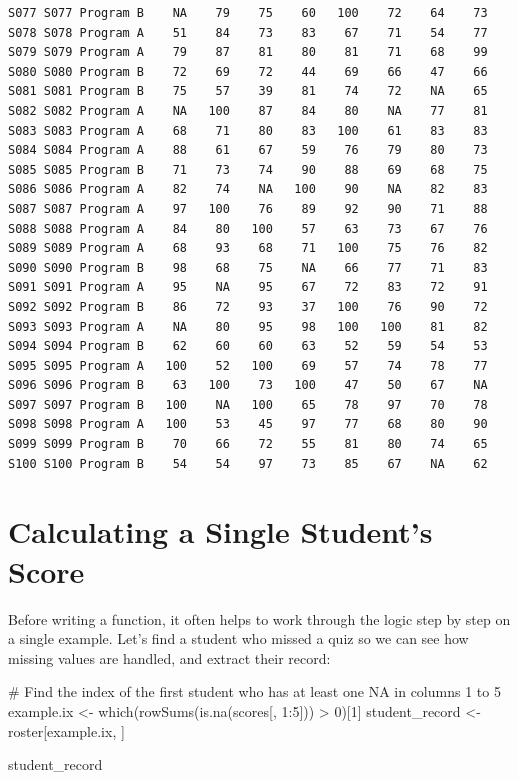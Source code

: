 \documentclass[
  letterpaper,
  DIV=11,
  numbers=noendperiod]{scrreprt}
\newenvironment{Shaded}{\begin{snugshade}}{\end{snugshade}}
\newcommand{\CommentTok}[1]{\textcolor[rgb]{0.37,0.37,0.37}{#1}}
\newcommand{\DecValTok}[1]{\textcolor[rgb]{0.68,0.00,0.00}{#1}}
\newcommand{\FunctionTok}[1]{\textcolor[rgb]{0.28,0.35,0.67}{#1}}
\newcommand{\NormalTok}[1]{\textcolor[rgb]{0.00,0.23,0.31}{#1}}
\newcommand{\OtherTok}[1]{\textcolor[rgb]{0.00,0.23,0.31}{#1}}
\newcommand{\SpecialCharTok}[1]{\textcolor[rgb]{0.37,0.37,0.37}{#1}}
\begin{document}
\begin{verbatim}
S077 S077 Program B    NA    79    75    60   100    72    64    73
S078 S078 Program A    51    84    73    83    67    71    54    77
S079 S079 Program A    79    87    81    80    81    71    68    99
S080 S080 Program B    72    69    72    44    69    66    47    66
S081 S081 Program B    75    57    39    81    74    72    NA    65
S082 S082 Program A    NA   100    87    84    80    NA    77    81
S083 S083 Program A    68    71    80    83   100    61    83    83
S084 S084 Program A    88    61    67    59    76    79    80    73
S085 S085 Program B    71    73    74    90    88    69    68    75
S086 S086 Program A    82    74    NA   100    90    NA    82    83
S087 S087 Program A    97   100    76    89    92    90    71    88
S088 S088 Program A    84    80   100    57    63    73    67    76
S089 S089 Program A    68    93    68    71   100    75    76    82
S090 S090 Program B    98    68    75    NA    66    77    71    83
S091 S091 Program A    95    NA    95    67    72    83    72    91
S092 S092 Program B    86    72    93    37   100    76    90    72
S093 S093 Program A    NA    80    95    98   100   100    81    82
S094 S094 Program B    62    60    60    63    52    59    54    53
S095 S095 Program A   100    52   100    69    57    74    78    77
S096 S096 Program B    63   100    73   100    47    50    67    NA
S097 S097 Program B   100    NA   100    65    78    97    70    78
S098 S098 Program A   100    53    45    97    77    68    80    90
S099 S099 Program B    70    66    72    55    81    80    74    65
S100 S100 Program B    54    54    97    73    85    67    NA    62
\end{verbatim}

\section{Calculating a Single Student's
Score}\label{calculating-a-single-students-score}

Before writing a function, it often helps to work through the logic step
by step on a single example. Let's find a student who missed a quiz so
we can see how missing values are handled, and extract their record:

\begin{Shaded}
\begin{Highlighting}[]
\CommentTok{\# Find the index of the first student who has at least one NA in columns 1 to 5}
\NormalTok{example.ix }\OtherTok{\textless{}{-}} \FunctionTok{which}\NormalTok{(}\FunctionTok{rowSums}\NormalTok{(}\FunctionTok{is.na}\NormalTok{(scores[, }\DecValTok{1}\SpecialCharTok{:}\DecValTok{5}\NormalTok{])) }\SpecialCharTok{\textgreater{}} \DecValTok{0}\NormalTok{)[}\DecValTok{1}\NormalTok{]}
\NormalTok{student\_record }\OtherTok{\textless{}{-}}\NormalTok{ roster[example.ix, ]}

\NormalTok{student\_record}
\end{Highlighting}
\end{Shaded}
\end{document}
